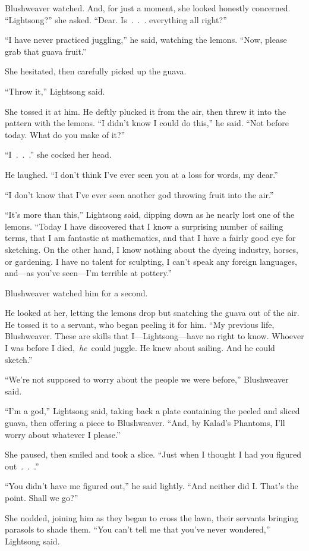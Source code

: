Blushweaver watched. And, for just a moment, she looked honestly concerned. “Lightsong?” she asked. “Dear. Is~.~.~. everything all right?”

“I have never practiced juggling,” he said, watching the lemons. “Now, please grab that guava fruit.”

She hesitated, then carefully picked up the guava.

“Throw it,” Lightsong said.

She tossed it at him. He deftly plucked it from the air, then threw it into the pattern with the lemons. “I didn’t know I could do this,” he said. “Not before today. What do you make of it?”

“I~.~.~.” she cocked her head.

He laughed. “I don’t think I’ve ever seen you at a loss for words, my dear.”

“I don’t know that I’ve ever seen another god throwing fruit into the air.”

“It’s more than this,” Lightsong said, dipping down as he nearly lost one of the lemons. “Today I have discovered that I know a surprising number of sailing terms, that I am fantastic at mathematics, and that I have a fairly good eye for sketching. On the other hand, I know nothing about the dyeing industry, horses, or gardening. I have no talent for sculpting, I can’t speak any foreign languages, and—as you’ve seen—I’m terrible at pottery.”

Blushweaver watched him for a second.

He looked at her, letting the lemons drop but snatching the guava out of the air. He tossed it to a servant, who began peeling it for him. “My previous life, Blushweaver. These are skills that I—Lightsong—have no right to know. Whoever I was before I died,~\textit{he}~could juggle. He knew about sailing. And he could sketch.”

“We’re not supposed to worry about the people we were before,” Blushweaver said.

“I’m a god,” Lightsong said, taking back a plate containing the peeled and sliced guava, then offering a piece to Blushweaver. “And, by Kalad’s Phantoms, I’ll worry about whatever I please.”

She paused, then smiled and took a slice. “Just when I thought I had you figured out~.~.~.”

“You didn’t have me figured out,” he said lightly. “And neither did I. That’s the point. Shall we go?”

She nodded, joining him as they began to cross the lawn, their servants bringing parasols to shade them. “You can’t tell me that you’ve never wondered,” Lightsong said.

